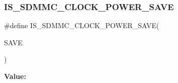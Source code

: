 \subsubsection{\texorpdfstring{IS\_SDMMC\_CLOCK\_POWER\_SAVE}{IS\_SDMMC\_CLOCK\_POWER\_SAVE}}
{\footnotesize\ttfamily \#define I\+S\+\_\+\+S\+D\+M\+M\+C\+\_\+\+C\+L\+O\+C\+K\+\_\+\+P\+O\+W\+E\+R\+\_\+\+S\+A\+VE(\begin{DoxyParamCaption}\item[{}]{S\+A\+VE }\end{DoxyParamCaption})}

{\bfseries Value\+:}
\begin{DoxyCode}{0}

\end{DoxyCode}

